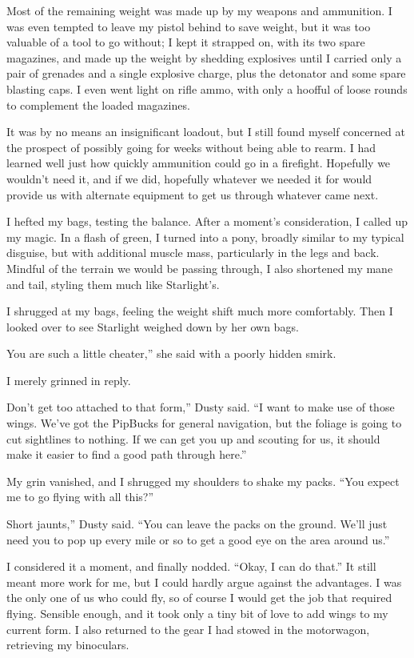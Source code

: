 Most of the remaining weight was made up by my weapons and ammunition. I was even tempted to leave my pistol behind to save weight, but it was too valuable of a tool to go without; I kept it strapped on, with its two spare magazines, and made up the weight by shedding explosives until I carried only a pair of grenades and a single explosive charge, plus the detonator and some spare blasting caps. I even went light on rifle ammo, with only a hoofful of loose rounds to complement the loaded magazines.

It was by no means an insignificant loadout, but I still found myself concerned at the prospect of possibly going for weeks without being able to rearm. I had learned well just how quickly ammunition could go in a firefight. Hopefully we wouldn’t need it, and if we did, hopefully whatever we needed it for would provide us with alternate equipment to get us through whatever came next.

I hefted my bags, testing the balance. After a moment’s consideration, I called up my magic. In a flash of green, I turned into a pony, broadly similar to my typical disguise, but with additional muscle mass, particularly in the legs and back. Mindful of the terrain we would be passing through, I also shortened my mane and tail, styling them much like Starlight’s.

I shrugged at my bags, feeling the weight shift much more comfortably. Then I looked over to see Starlight weighed down by her own bags.

\leavevmode{}You are such a little cheater,” she said with a poorly hidden smirk.

I merely grinned in reply.

\leavevmode{}Don’t get too attached to that form,” Dusty said. “I want to make use of those wings. We’ve got the PipBucks for general navigation, but the foliage is going to cut sightlines to nothing. If we can get you up and scouting for us, it should make it easier to find a good path through here.”

My grin vanished, and I shrugged my shoulders to shake my packs. “You expect me to go flying with all this?”

\leavevmode{}Short jaunts,” Dusty said. “You can leave the packs on the ground. We’ll just need you to pop up every mile or so to get a good eye on the area around us.”

I considered it a moment, and finally nodded. “Okay, I can do that.” It still meant more work for me, but I could hardly argue against the advantages. I was the only one of us who could fly, so of course I would get the job that required flying. Sensible enough, and it took only a tiny bit of love to add wings to my current form. I also returned to the gear I had stowed in the motorwagon, retrieving my binoculars.

